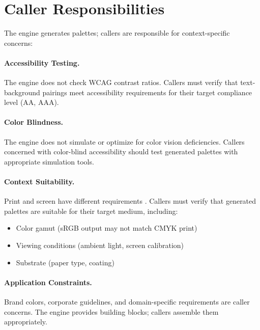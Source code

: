 \section{Caller Responsibilities}
\label{sec:caller-responsibilities}
\label{sec:caller-duties}

The engine generates palettes; callers are responsible for context-specific concerns:

\paragraph{Accessibility Testing.} The engine does not check WCAG contrast ratios. Callers must verify that text-background pairings meet accessibility requirements for their target compliance level (AA, AAA).

\paragraph{Color Blindness.} The engine does not simulate or optimize for color vision deficiencies. Callers concerned with color-blind accessibility should test generated palettes with appropriate simulation tools.

\paragraph{Context Suitability.} Print and screen have different requirements \citep{poynton2012}. Callers must verify that generated palettes are suitable for their target medium, including:
\begin{itemize}
    \item Color gamut (sRGB output may not match CMYK print)
    \item Viewing conditions (ambient light, screen calibration)
    \item Substrate (paper type, coating)
\end{itemize}

\paragraph{Application Constraints.} Brand colors, corporate guidelines, and domain-specific requirements are caller concerns. The engine provides building blocks; callers assemble them appropriately.

